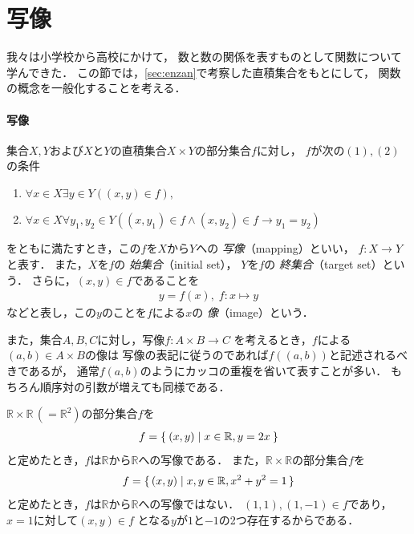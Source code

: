  \section{写像}
 \label{sec:mapping}
   
   我々は小学校から高校にかけて，
   数と数の関係を表すものとして関数について学んできた．
   この節では，\ref{sec:enzan}で考察した直積集合をもとにして，
   関数の概念を一般化することを考える．

   \paragraph{写像}
    集合$X,  Y$および$X$と$Y$の直積集合$X \times Y$の部分集合$f$に対し，
    $f$が次の$(1),(2)$の条件
    \begin{enumerate}[(1) ]
      \item $\forall x \in X \exists y \in Y ( (x,y) \in f),$
      \item $\forall x \in X \forall y_1 , y_2 \in Y ( 
             (x,y_1) \in f \land (x,y_2) \in f \to y_1 = y_2)$
         \end{enumerate}
    をともに満たすとき，この$f$を$X$から$Y$への
    \emph{写像}（mapping）といい，
    $f:X \longrightarrow Y$と表す．
    また，$X$を$f$の
    \emph{始集合}（initial set），
    $Y$を$f$の
    \emph{終集合}（target set）という．
    さらに，$(x,y) \in f$であることを
    \begin{align}
      y = f(x), \; f: x \longmapsto y
      \label{eq:function}
    \end{align}
    などと表し，この$y$のことを$f$による$x$の
    \emph{像}（image）という．

    また，集合$A,  B,  C$に対し，写像$f:A \times B \longrightarrow C$
    を考えるとき，$f$による$(a,b) \in A \times B$の像は
    写像の表記に従うのであれば$f((a,b))$と記述されるべきであるが，
    通常$f(a,b)$のようにカッコの重複を省いて表すことが多い．
    もちろん順序対の引数が増えても同様である．

    \begin{ex} \label{ex:mappingset}
      $\mathbb{R} \times \mathbb{R} \, (= \mathbb{R}^2)$の部分集合$f$を
      \begin{align*}
        f = \Set{ (x,y) \mid x \in \mathbb{R},  y = 2x}
      \end{align*}
      と定めたとき，$f$は$\mathbb{R}$から$\mathbb{R}$への写像である．
      また，$\mathbb{R} \times \mathbb{R}$の部分集合$f$を
      \begin{align*}
        f = \set{ (x,y) \mid x ,  y \in \mathbb{R} ,  x^2 + y^2 =1}
      \end{align*}
      と定めたとき，$f$は$\mathbb{R}$から$\mathbb{R}$への写像ではない．
      $(1,1) ,  (1,-1) \in f$であり，$x=1$に対して$(x,y) \in f$
      となる$y$が$1$と$-1$の2つ存在するからである．
    \end{ex}
    
